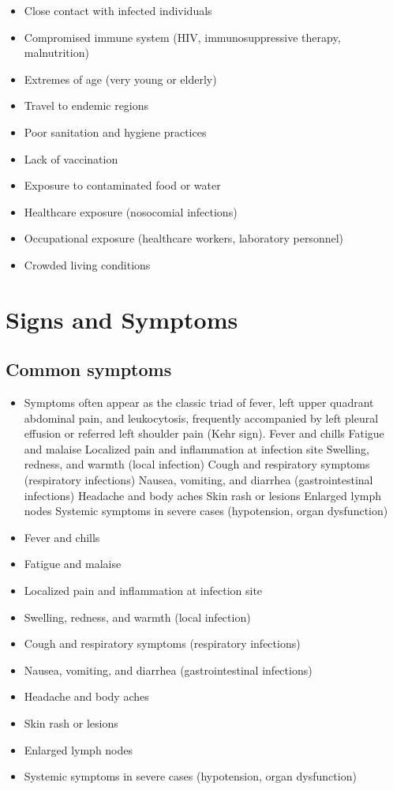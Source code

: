 \begin{itemize}[noitemsep]
  \item Close contact with infected individuals
  \item Compromised immune system (HIV, immunosuppressive therapy, malnutrition)
  \item Extremes of age (very young or elderly)
  \item Travel to endemic regions
  \item Poor sanitation and hygiene practices
  \item Lack of vaccination
  \item Exposure to contaminated food or water
  \item Healthcare exposure (nosocomial infections)
  \item Occupational exposure (healthcare workers, laboratory personnel)
  \item Crowded living conditions
\end{itemize}
\section{Signs and Symptoms}

\subsection{Common symptoms}
\begin{itemize}[noitemsep]
  \item Symptoms often appear as the classic triad of fever, left upper quadrant abdominal pain, and leukocytosis, frequently accompanied by left pleural effusion or referred left shoulder pain (Kehr sign). Fever and chills Fatigue and malaise Localized pain and inflammation at infection site Swelling, redness, and warmth (local infection) Cough and respiratory symptoms (respiratory infections) Nausea, vomiting, and diarrhea (gastrointestinal infections) Headache and body aches Skin rash or lesions Enlarged lymph nodes Systemic symptoms in severe cases (hypotension, organ dysfunction)
  \item Fever and chills
  \item Fatigue and malaise
  \item Localized pain and inflammation at infection site
  \item Swelling, redness, and warmth (local infection)
  \item Cough and respiratory symptoms (respiratory infections)
  \item Nausea, vomiting, and diarrhea (gastrointestinal infections)
  \item Headache and body aches
  \item Skin rash or lesions
  \item Enlarged lymph nodes
  \item Systemic symptoms in severe cases (hypotension, organ dysfunction)
\end{itemize}


